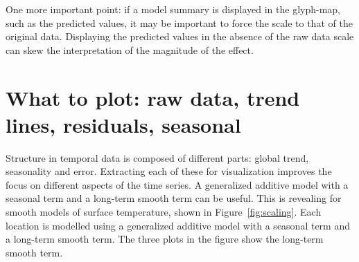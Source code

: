 \documentclass[oneside]{article}
\begin{document}




One more important point: if a model summary is displayed in the glyph-map, such as the predicted values, it may be important to force the scale to that of the original data. Displaying the predicted values in the absence of the raw data scale can skew the interpretation of the magnitude of the effect. 

\section{What to plot: raw data, trend lines, residuals,  seasonal}

Structure in temporal data is composed of different parts: global trend, seasonality and error. Extracting each of these for visualization improves the focus on different aspects of the time series. A generalized additive model \citep{wood:2006} with a seasonal term and a long-term smooth term can be useful. This is revealing for smooth models of surface temperature, shown in Figure~\ref{fig:scaling}. Each location is modelled using a generalized additive model \citep{wood:2006} with a seasonal term and a long-term smooth term. The three plots in the figure show the long-term smooth term. %
\end{document}
